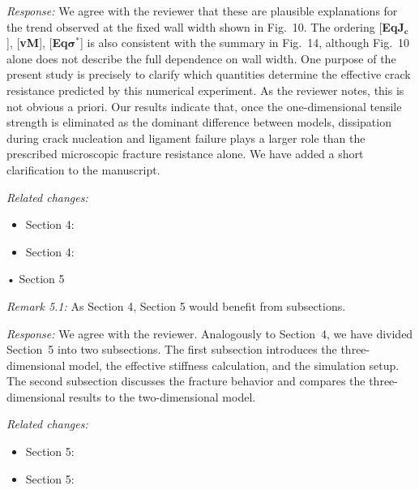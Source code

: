 \documentclass[pdflatex,sn-mathphys-num]{sn-jnl}
\newcommand{\vMLabel}{[\textbf{vM}]\xspace}
\newcommand{\EqJcLabel}{[\textbf{Eq$\boldsymbol{J_c}$}]\xspace}
\newcommand{\EqSigmaStarLabel}{[\textbf{Eq$\boldsymbol{\sigma^*}$}]\xspace}
\begin{document}
\emph{Response:} We agree with the reviewer that these are plausible explanations for the trend observed at the fixed wall width shown in Fig.~10. The ordering \EqJcLabel, \vMLabel, \EqSigmaStarLabel is also consistent with the summary in Fig.~14, although Fig.~10 alone does not describe the full dependence on wall width. One purpose of the present study is precisely to clarify which quantities determine the effective crack resistance predicted by this numerical experiment. As the reviewer notes, this is not obvious a priori. Our results indicate that, once the one-dimensional tensile strength is eliminated as the dominant difference between models, dissipation during crack nucleation and ligament failure plays a larger role than the prescribed microscopic fracture resistance alone. We have added a short clarification to the manuscript.

\emph{Related changes:}
\begin{itemize}
\item Section 4: 
\item Section 4: 
\end{itemize}

\bigskip

\noindent
• Section 5

\emph{Remark 5.1:} As Section 4, Section 5 would benefit from subsections.

\emph{Response:} We agree with the reviewer. Analogously to Section~4, we have divided Section~5 into two subsections. The first subsection introduces the three-dimensional model, the effective stiffness calculation, and the simulation setup. The second subsection discusses the fracture behavior and compares the three-dimensional results to the two-dimensional model.

\emph{Related changes:}
\begin{itemize}
\item Section 5: 
\item Section 5: 
\end{itemize}
\end{document}
